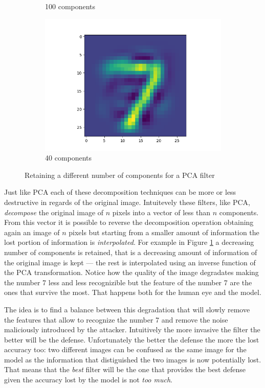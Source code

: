 \begin{figure}
\begin{subfigure}{0.3\linewidth}
    \caption{100 components}
  \end{subfigure}
  \begin{subfigure}{0.3\linewidth}
    \includegraphics[width=\linewidth]{Images/filtered-input-pca-40-components.png}
    \caption{40 components}
  \end{subfigure}
  \caption{Retaining a different number of components for a PCA filter}
  \label{fig:various-pca-reductions}
\end{figure}

Just like PCA each of these decomposition techniques can be more or
less destructive in regards of the original image. Intuitevely these
filters, like PCA, \emph{decompose} the original image of $n$ pixels
into a vector of less than $n$ components. From this vector it is
possible to reverse the decomposition operation obtaining again an
image of $n$ pixels but starting from a smaller amount of information
the lost portion of information is \emph{interpolated}. For example in
Figure \ref{fig:various-pca-reductions} a decreasing number of
components is retained, that is a decreasing amount of information of
the original image is kept --- the rest is interpolated using an
inverse function of the PCA transformation. Notice how the quality of
the image degradates making the number 7 less and less recognizible but
the feature of the number 7 are the ones that survive the most. That
happens both for the human eye and the model.

The idea is to find a balance between this degradation that will slowly
remove the features that allow to recognize the number 7 and remove the
noise maliciously introduced by the attacker. Intuitively the more
invasive the filter the better will be the defense. Unfortunately the
better the defense the more the lost accuracy too: two different images
can be confused as the same image for the model as the information that
distiguished the two images is now potentially lost. That means that
the \emph{best} filter will be the one that provides the best defense
given the accuracy lost by the model is not \emph{too much}.

